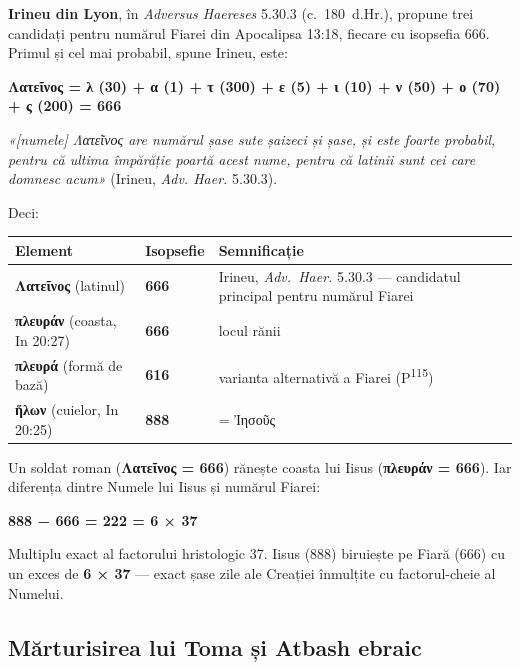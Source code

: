 \documentclass[12pt,a4paper,twoside,openany]{book}
\begin{document}
\textbf{Irineu din Lyon}, în \textit{Adversus Haereses} 5.30.3 (c.~180~d.Hr.), propune trei candidați pentru numărul Fiarei din Apocalipsa 13:18, fiecare cu isopsefia 666. Primul și cel mai probabil, spune Irineu, este:

\begin{center}
\textbf{Λατεῖνος = λ (30) + α (1) + τ (300) + ε (5) + ι (10) + ν (50) + ο (70) + ς (200) = 666}
\end{center}

\textit{«[numele] Λατεῖνος are numărul șase sute șaizeci și șase, și este foarte probabil, pentru că ultima împărăție poartă acest nume, pentru că latinii sunt cei care domnesc acum»} (Irineu, \textit{Adv. Haer.} 5.30.3).

Deci:

\begin{center}
\small
\begin{tabularx}{\textwidth}{L{4cm}L{3cm}X}
\toprule
{}
\textbf{Element} & \textbf{Isopsefie} & \textbf{Semnificație} \\
\midrule
\textbf{Λατεῖνος} (latinul) & \textbf{666} & Irineu, \textit{Adv.\ Haer.} 5.30.3 --- candidatul principal pentru numărul Fiarei \\
\textbf{πλευράν} (coasta, In 20:27) & \textbf{666} & locul rănii \\
\textbf{πλευρά} (formă de bază) & \textbf{616} & varianta alternativă a Fiarei (P\textsuperscript{115}) \\
\textbf{ἥλων} (cuielor, In 20:25) & \textbf{888} & = Ἰησοῦς \\
\bottomrule
\end{tabularx}
\end{center}

Un soldat roman (\textbf{Λατεῖνος = 666}) rănește coasta lui Iisus (\textbf{πλευράν = 666}). Iar diferența dintre Numele lui Iisus și numărul Fiarei:

\begin{center}
\textbf{888 − 666 = 222 = 6 × 37}
\end{center}

Multiplu exact al factorului hristologic 37. Iisus (888) biruiește pe Fiară (666) cu un exces de \textbf{6 × 37} --- exact șase zile ale Creației înmulțite cu factorul-cheie al Numelui.

\subsection{Mărturisirea lui Toma și Atbash ebraic}
\end{document}
